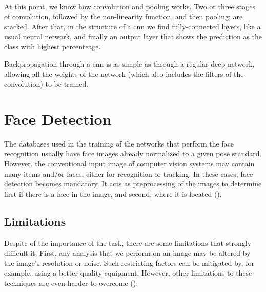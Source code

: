 At this point, we know how convolution and pooling works. Two or three stages of convolution, followed by the non-linearity function, and then pooling; are stacked. After that, in the structure of a \gls{cnn} we find fully-connected layers, like a usual neural network, and finally an output layer that shows the prediction as the class with highest percenteage.

Backpropagation through a \gls{cnn} is as simple as through a regular deep network, allowing all the weights of the network (which also includes the filters of the convolution) to be trained.

\section{Face Detection}
The databases used in the training of the networks that perform the face recognition usually have face images already normalized  to  a  given  pose  standard. However,  the  conventional  input  image  of  computer  vision  systems  may  contain many items and/or faces, either for recognition or tracking. In these cases, face detection becomes mandatory. It acts as preprocessing of the images to determine first
if there is a face in the image, and second, where it is located (\cite{marques2010face}).

	\subsection{Limitations}
	Despite of the importance of the task, there are some limitations that strongly difficult it. First, any analysis that we perform on an image may be altered by the image’s resolution or noise. Such restricting factors can be mitigated by, for example, using a better quality equipment. However, other limitations to these techniques are even harder to overcome (\cite{yang2002detecting}):

